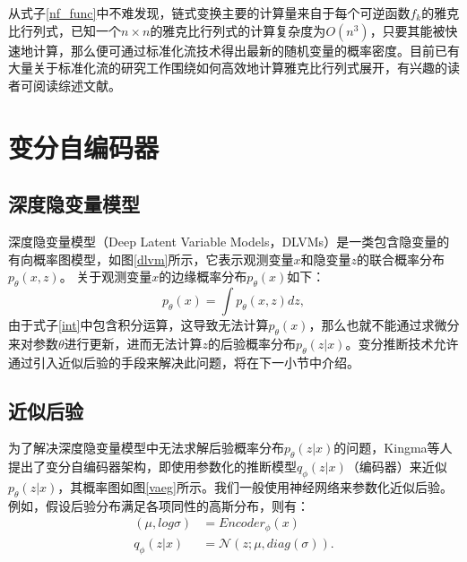 从式子\eqref{nf_func}中不难发现，链式变换主要的计算量来自于每个可逆函数$f_k$的雅克比行列式，已知一个$n \times n$的雅克比行列式的计算复杂度为$O(n^3)$，只要其能被快速地计算，那么便可通过标准化流技术得出最新的随机变量的概率密度。目前已有大量关于标准化流的研究工作围绕如何高效地计算雅克比行列式展开，有兴趣的读者可阅读综述文献。
\section{变分自编码器}
\subsection{深度隐变量模型}
深度隐变量模型（Deep Latent Variable Models，DLVMs）是一类包含隐变量的有向概率图模型，如图\ref{dlvm}所示，它表示观测变量$x$和隐变量$z$的联合概率分布$p_{\theta}(x, z)$。
关于观测变量$x$的边缘概率分布$p_{\theta}(x)$如下：
\begin{equation}
	p_{\theta}(x)=\int p_{\theta}(x, z) d z, \label{int}
\end{equation}
由于式子\eqref{int}中包含积分运算，这导致无法计算$p_{\theta}(x)$，那么也就不能通过求微分来对参数$\theta$进行更新，进而无法计算$z$的后验概率分布$p_{\theta}(z|x)$。变分推断技术允许通过引入近似后验的手段来解决此问题，将在下一小节中介绍。


\subsection{近似后验}
为了解决深度隐变量模型中无法求解后验概率分布$p_{\theta}(z|x)$的问题，Kingma\cite{kingma2013auto}等人提出了变分自编码器架构，即使用参数化的推断模型$q_{\phi}(z|x)$（编码器）来近似$p_{\theta}(z|x)$，其概率图如图\ref{vaeg}所示。我们一般使用神经网络来参数化近似后验。例如，假设后验分布满足各项同性的高斯分布，则有：
\begin{equation}
\begin{split}
	(\mu, log\sigma) & = Encoder_{\phi}(x) \\
	q_{\phi}(z|x) & = \mathcal{N}(z;\mu, diag(\sigma)) .
\end{split}
\end{equation}

